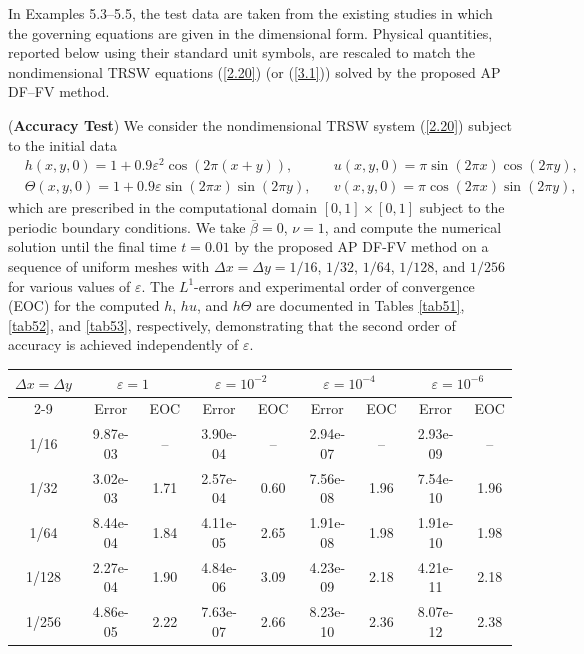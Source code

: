 \documentclass[a4paper,11pt,twoside]{article}
\numberwithin{equation}{section}
\numberwithin{figure}{section}
\numberwithin{table}{section}
\newcommand{\eps}{\varepsilon}
\newcommand{\dx}{\Delta x}
\newcommand{\dy}{\Delta y}
\newcommand\eref[1]{(\ref{#1})}
\begin{document}
In Examples 5.3--5.5, the test data are taken from the existing studies in which the governing equations are given in the dimensional form.
Physical quantities, reported below using their standard unit symbols, are rescaled to match the nondimensional TRSW equations \eref{2.20}
(or \eref{3.1}) solved by the proposed AP DF–FV method.

\begin{example}({\bf Accuracy Test})
We consider the nondimensional TRSW system \eref{2.20} subject to the initial data
\begin{equation*}
\begin{aligned}
&h(x,y,0)=1+0.9\eps^2\cos(2\pi(x+y)),&&u(x,y,0)=\pi\sin(2\pi x)\cos(2\pi y),\\
&\Theta(x,y,0)=1+0.9\eps\sin(2\pi x)\sin(2\pi y),&&v(x,y,0)=\pi\cos(2\pi x)\sin(2\pi y),
\end{aligned}
\end{equation*}
which are prescribed in the computational domain $[0,1]\times[0,1]$ subject to the periodic boundary conditions. We take $\bar\beta=0$,
$\nu=1$, and compute the numerical solution until the final time $t=0.01$ by the proposed AP DF-FV method on a sequence of uniform meshes
with $\dx=\dy=1/16$, $1/32$, $1/64$, $1/128$, and $1/256$ for various values of $\eps$. The $L^1$-errors and experimental order of
convergence (EOC) for the computed $h$, $hu$, and $h\Theta$ are documented in Tables \ref{tab51}, \ref{tab52}, and \ref{tab53},
respectively, demonstrating that the second order of accuracy is achieved independently of $\eps$.
\begin{table}[ht!]
\centering
\begin{tabular}{|c|cc|cc|cc|cc|}
\hline
\multirow{2}{*}{$\dx=\dy$}&\multicolumn{2}{c|}{$\eps=1$}&\multicolumn{2}{c|}{$\eps=10^{-2}$}&\multicolumn{2}{c|}{$\eps=10^{-4}$}
&\multicolumn{2}{c|}{$\eps=10^{-6}$}\\
\cline{2-9}
&Error&EOC&Error&EOC&Error&EOC&Error&EOC\\
\hline  		         
1/16 &9.87e-03& -- &3.90e-04& -- &2.94e-07& -- &2.93e-09& -- \\
1/32 &3.02e-03&1.71&2.57e-04&0.60&7.56e-08&1.96&7.54e-10&1.96\\        
1/64 &8.44e-04&1.84&4.11e-05&2.65&1.91e-08&1.98&1.91e-10&1.98\\          
1/128&2.27e-04&1.90&4.84e-06&3.09&4.23e-09&2.18&4.21e-11&2.18\\
1/256&4.86e-05&2.22&7.63e-07&2.66&8.23e-10&2.36&8.07e-12&2.38\\

\end{tabular}
\end{table}
\end{example}
\end{document}
